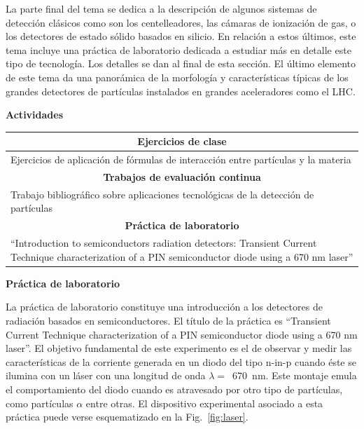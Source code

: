 La parte final del tema se dedica a la descripción de algunos sistemas de detección clásicos como son los centelleadores, las cámaras de ionización de gas, o los detectores de estado sólido basados en silicio. En relación a estos últimos, este tema incluye una práctica de laboratorio dedicada a estudiar más en detalle este tipo de tecnología. Los detalles se dan al final de esta sección. El último elemento de este tema da una panorámica de la morfología y características típicas de los grandes detectores de partículas instalados en grandes aceleradores como el LHC. 

\textbf{Actividades}

\begin{center}
\begin{tabularx}{\textwidth}{|X|}
\hline\hline
\multicolumn{1}{|c|}{\textbf{Ejercicios de clase}}\\
\hline\hline
Ejercicios de aplicación de fórmulas de interacción entre partículas y la materia\\
\hline\hline
\multicolumn{1}{|c|}{\textbf{Trabajos de evaluación continua}}\\
\hline\hline
Trabajo bibliográfico sobre aplicaciones tecnológicas de la detección de partículas\\
\hline\hline
\multicolumn{1}{|c|}{\textbf{Práctica de laboratorio}}\\
\hline\hline
``Introduction to semiconductors radiation detectors: Transient Current Technique characterization of a PIN semiconductor diode using a 670 nm laser''\\ 
\hline\hline
\end{tabularx}
\end{center}

\textbf{Práctica de laboratorio}

La práctica de laboratorio constituye una introducción a los detectores de radiación basados en semiconductores. El título de la práctica es ``Transient Current Technique characterization of a PIN semiconductor diode using a 670 nm laser''. El objetivo fundamental de este experimento es el de observar y medir las características de la corriente generada en un diodo del tipo n-in-p cuando éste se ilumina con un láser con una longitud de onda $\lambda=$~670~nm. Este montaje emula el comportamiento del diodo cuando es atravesado por otro tipo de partículas, como partículas $\alpha$ entre otras. El dispositivo experimental asociado a esta práctica puede verse esquematizado en la Fig.~\ref{fig:laser}.  

